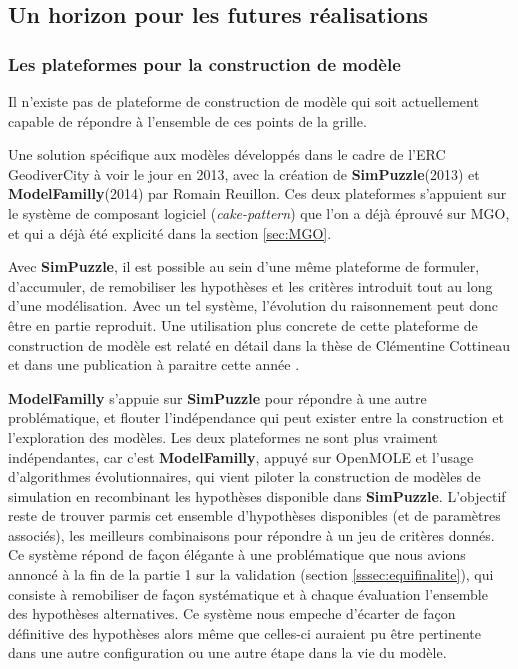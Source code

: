 \subsection{Un horizon pour les futures réalisations}

\subsubsection{Les plateformes pour la construction de modèle}

Il n'existe pas de plateforme de construction de modèle qui soit actuellement capable de répondre à l'ensemble de ces points de la grille. 

Une solution spécifique aux modèles développés dans le cadre de l'ERC GeodiverCity à voir le jour en 2013, avec la création de \textbf{SimPuzzle}(2013) et \textbf{ModelFamilly}(2014) par Romain Reuillon. Ces deux plateformes s'appuient sur le système de composant logiciel (\textit{cake-pattern}) que l'on a déjà éprouvé sur MGO, et qui a déjà été explicité dans la section \ref{sec:MGO}. 

Avec \textbf{SimPuzzle}, il est possible au sein d'une même plateforme de formuler, d'accumuler, de remobiliser les hypothèses et les critères introduit tout au long d'une modélisation. Avec un tel système, l'évolution du raisonnement peut donc être en partie reproduit. Une utilisation plus concrete de cette plateforme de construction de modèle est relaté en détail dans la thèse de Clémentine Cottineau \autocite{Cottineau2014b} et dans une publication à paraitre cette année \autocite{Cottineau2015}.

\textbf{ModelFamilly} s'appuie sur \textbf{SimPuzzle} pour répondre à une autre problématique, et flouter l'indépendance qui peut exister entre la construction et l'exploration des modèles. Les deux plateformes ne sont plus vraiment indépendantes, car c'est \textbf{ModelFamilly}, appuyé sur OpenMOLE et l'usage d'algorithmes évolutionnaires, qui vient piloter la construction de modèles de simulation en recombinant les hypothèses disponible dans \textbf{SimPuzzle}. L'objectif reste de trouver parmis cet ensemble d'hypothèses disponibles (et de paramètres associés), les meilleurs combinaisons pour répondre à un jeu de critères donnés. Ce système répond de façon élégante à une problématique que nous avions annoncé à la fin de la partie 1 sur la validation (section \ref{sssec:equifinalite}), qui consiste à remobiliser de façon systématique et à chaque évaluation l'ensemble des hypothèses alternatives. Ce système nous empeche d'écarter de façon définitive des hypothèses alors même que celles-ci auraient pu être pertinente dans une autre configuration ou une autre étape dans la vie du modèle.     

